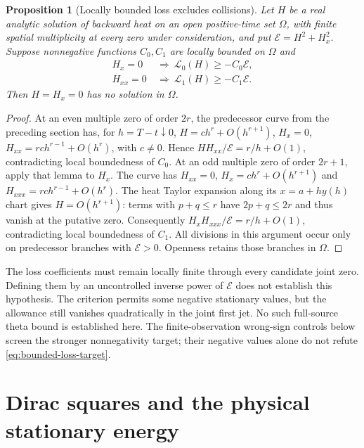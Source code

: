 \documentclass[11pt]{article}
\numberwithin{equation}{section}
\newtheorem{proposition}[theorem]{Proposition}
\theoremstyle{definition}
\theoremstyle{remark}
\begin{document}
\begin{proposition}[Locally bounded loss excludes collisions]\label{prop:bounded-loss}
Let $H$ be a real analytic solution of backward heat on an open
positive-time set $\Omega$, with finite spatial multiplicity at every
zero under consideration, and put
$\mathcal E=H^2+H_x^2$. Suppose nonnegative functions $C_0,C_1$ are
locally bounded on $\Omega$ and
\begin{align}
 H_x=0&\ \Longrightarrow\ \mathscr L_0(H)\ge-C_0\mathcal E,\nonumber\\
 H_{xx}=0&\ \Longrightarrow\ \mathscr L_1(H)\ge-C_1\mathcal E.
 \label{eq:bounded-loss-target}
\end{align}
Then $H=H_x=0$ has no solution in $\Omega$.
\end{proposition}
\begin{proof}
At an even multiple zero of order $2r$, the predecessor curve from the
preceding section has, for $h=T-t\downarrow0$,
$H=ch^r+O(h^{r+1})$, $H_x=0$,
$H_{xx}=rc h^{r-1}+O(h^r)$, with $c\ne0$. Hence
$HH_{xx}/\mathcal E=r/h+O(1)$, contradicting local boundedness of $C_0$.
At an odd multiple zero of order $2r+1$, apply that lemma to $H_x$.
The curve has $H_{xx}=0$, $H_x=ch^r+O(h^{r+1})$ and
$H_{xxx}=rc h^{r-1}+O(h^r)$. The heat Taylor expansion along its
$x=a+hy(h)$ chart gives $H=O(h^{r+1})$: terms with $p+q\le r$ have
$2p+q\le2r$ and thus vanish at the putative zero. Consequently
$H_xH_{xxx}/\mathcal E=r/h+O(1)$, contradicting local boundedness of $C_1$.
All divisions in this argument occur only on predecessor branches with
$\mathcal E>0$. Openness retains those branches in $\Omega$.
\end{proof}
The loss coefficients must remain locally finite through every candidate
joint zero. Defining them by an uncontrolled inverse power of
$\mathcal E$ does not establish this hypothesis. The criterion permits
some negative stationary values, but the allowance still vanishes
quadratically in the joint first jet. No such full-source theta bound
is established here. The finite-observation wrong-sign controls below
screen the stronger nonnegativity target; their negative values alone
do not refute \eqref{eq:bounded-loss-target}.


\section{Dirac squares and the physical stationary energy}
\label{sec:theta-dirac}
\end{document}
